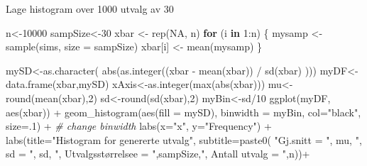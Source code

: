 \documentclass[
]{book}
\newenvironment{Shaded}{\begin{snugshade}}{\end{snugshade}}
\newcommand{\AttributeTok}[1]{\textcolor[rgb]{0.77,0.63,0.00}{#1}}
\newcommand{\CommentTok}[1]{\textcolor[rgb]{0.56,0.35,0.01}{\textit{#1}}}
\newcommand{\ConstantTok}[1]{\textcolor[rgb]{0.00,0.00,0.00}{#1}}
\newcommand{\ControlFlowTok}[1]{\textcolor[rgb]{0.13,0.29,0.53}{\textbf{#1}}}
\newcommand{\DecValTok}[1]{\textcolor[rgb]{0.00,0.00,0.81}{#1}}
\newcommand{\FunctionTok}[1]{\textcolor[rgb]{0.00,0.00,0.00}{#1}}
\newcommand{\NormalTok}[1]{#1}
\newcommand{\OtherTok}[1]{\textcolor[rgb]{0.56,0.35,0.01}{#1}}
\newcommand{\SpecialCharTok}[1]{\textcolor[rgb]{0.00,0.00,0.00}{#1}}
\newcommand{\StringTok}[1]{\textcolor[rgb]{0.31,0.60,0.02}{#1}}
\begin{document}
Lage histogram over 1000 utvalg av 30

\begin{Shaded}
\begin{Highlighting}[]
\NormalTok{n}\OtherTok{\textless{}{-}}\DecValTok{10000}
\NormalTok{sampSize}\OtherTok{\textless{}{-}}\DecValTok{30}
\NormalTok{xbar }\OtherTok{\textless{}{-}} \FunctionTok{rep}\NormalTok{(}\ConstantTok{NA}\NormalTok{, n)}
\ControlFlowTok{for}\NormalTok{ (i }\ControlFlowTok{in} \DecValTok{1}\SpecialCharTok{:}\NormalTok{n) \{}
\NormalTok{  mysamp }\OtherTok{\textless{}{-}} \FunctionTok{sample}\NormalTok{(sims, }\AttributeTok{size =}\NormalTok{ sampSize)}
\NormalTok{  xbar[i] }\OtherTok{\textless{}{-}} \FunctionTok{mean}\NormalTok{(mysamp)}
\NormalTok{\}}

\NormalTok{mySD}\OtherTok{\textless{}{-}}\FunctionTok{as.character}\NormalTok{( }\FunctionTok{abs}\NormalTok{(}\FunctionTok{as.integer}\NormalTok{((xbar }\SpecialCharTok{{-}} \FunctionTok{mean}\NormalTok{(xbar)) }\SpecialCharTok{/} \FunctionTok{sd}\NormalTok{(xbar) )))}
\NormalTok{myDF}\OtherTok{\textless{}{-}}\FunctionTok{data.frame}\NormalTok{(xbar,mySD)}
\NormalTok{xAxis}\OtherTok{\textless{}{-}}\FunctionTok{as.integer}\NormalTok{(}\FunctionTok{max}\NormalTok{(}\FunctionTok{abs}\NormalTok{(xbar)))}
\NormalTok{mu}\OtherTok{\textless{}{-}}\FunctionTok{round}\NormalTok{(}\FunctionTok{mean}\NormalTok{(xbar),}\DecValTok{2}\NormalTok{)}
\NormalTok{sd}\OtherTok{\textless{}{-}}\FunctionTok{round}\NormalTok{(}\FunctionTok{sd}\NormalTok{(xbar),}\DecValTok{2}\NormalTok{)}
\NormalTok{myBin}\OtherTok{\textless{}{-}}\NormalTok{sd}\SpecialCharTok{/}\DecValTok{10}
\FunctionTok{ggplot}\NormalTok{(myDF, }\FunctionTok{aes}\NormalTok{(xbar)) }\SpecialCharTok{+}
  \FunctionTok{geom\_histogram}\NormalTok{(}\FunctionTok{aes}\NormalTok{(}\AttributeTok{fill =}\NormalTok{ mySD), }\AttributeTok{binwidth =}\NormalTok{ myBin, }\AttributeTok{col=}\StringTok{"black"}\NormalTok{, }\AttributeTok{size=}\NormalTok{.}\DecValTok{1}\NormalTok{) }\SpecialCharTok{+}  \CommentTok{\# change binwidth}
  \FunctionTok{labs}\NormalTok{(}\AttributeTok{x=}\StringTok{"x"}\NormalTok{, }\AttributeTok{y=}\StringTok{"Frequency"}\NormalTok{) }\SpecialCharTok{+} 
  \FunctionTok{labs}\NormalTok{(}\AttributeTok{title=}\StringTok{"Histogram for genererte utvalg"}\NormalTok{,}
  \AttributeTok{subtitle=}\FunctionTok{paste0}\NormalTok{(  }\StringTok{"Gj.snitt = "}\NormalTok{, mu, }\StringTok{", sd = "}\NormalTok{, sd, }\StringTok{", Utvalgsstørrelsee = "}\NormalTok{,sampSize,}\StringTok{", Antall utvalg = "}\NormalTok{,n))}\SpecialCharTok{+}

\end{Highlighting}
\end{Shaded}
\end{document}
